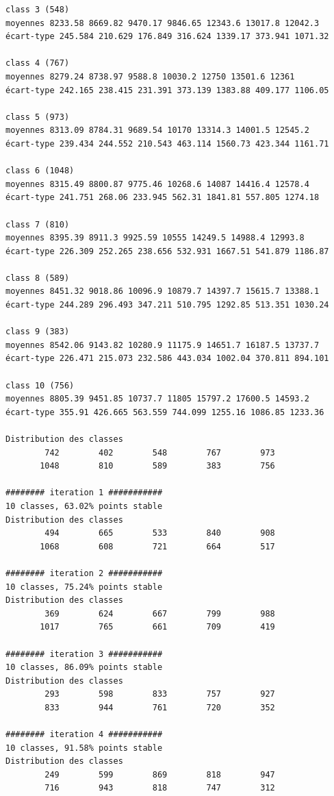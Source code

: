 \documentclass[analytics,article,accept,pdftex,moreauthors]{Definitions/mdpi}
\begin{document}
\begin{footnotesize}
\begin{verbatim}
class 3 (548)
moyennes 8233.58 8669.82 9470.17 9846.65 12343.6 13017.8 12042.3
écart-type 245.584 210.629 176.849 316.624 1339.17 373.941 1071.32

class 4 (767)
moyennes 8279.24 8738.97 9588.8 10030.2 12750 13501.6 12361
écart-type 242.165 238.415 231.391 373.139 1383.88 409.177 1106.05

class 5 (973)
moyennes 8313.09 8784.31 9689.54 10170 13314.3 14001.5 12545.2
écart-type 239.434 244.552 210.543 463.114 1560.73 423.344 1161.71

class 6 (1048)
moyennes 8315.49 8800.87 9775.46 10268.6 14087 14416.4 12578.4
écart-type 241.751 268.06 233.945 562.31 1841.81 557.805 1274.18

class 7 (810)
moyennes 8395.39 8911.3 9925.59 10555 14249.5 14988.4 12993.8
écart-type 226.309 252.265 238.656 532.931 1667.51 541.879 1186.87

class 8 (589)
moyennes 8451.32 9018.86 10096.9 10879.7 14397.7 15615.7 13388.1
écart-type 244.289 296.493 347.211 510.795 1292.85 513.351 1030.24

class 9 (383)
moyennes 8542.06 9143.82 10280.9 11175.9 14651.7 16187.5 13737.7
écart-type 226.471 215.073 232.586 443.034 1002.04 370.811 894.101

class 10 (756)
moyennes 8805.39 9451.85 10737.7 11805 15797.2 17600.5 14593.2
écart-type 355.91 426.665 563.559 744.099 1255.16 1086.85 1233.36

Distribution des classes
        742        402        548        767        973
       1048        810        589        383        756

######## iteration 1 ###########
10 classes, 63.02% points stable
Distribution des classes
        494        665        533        840        908
       1068        608        721        664        517

######## iteration 2 ###########
10 classes, 75.24% points stable
Distribution des classes
        369        624        667        799        988
       1017        765        661        709        419

######## iteration 3 ###########
10 classes, 86.09% points stable
Distribution des classes
        293        598        833        757        927
        833        944        761        720        352

######## iteration 4 ###########
10 classes, 91.58% points stable
Distribution des classes
        249        599        869        818        947
        716        943        818        747        312


\end{verbatim}
\end{footnotesize}
\end{document}
